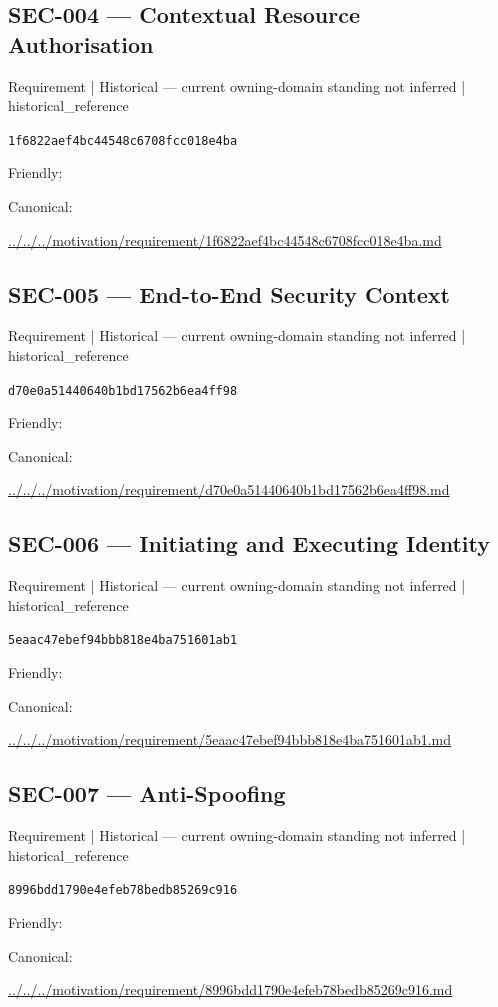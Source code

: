 \documentclass[10pt,a4paper]{article}
\begin{document}
\subsection*{SEC-004 — Contextual Resource Authorisation}
{\small Requirement | Historical — current owning-domain standing not inferred | historical\_reference}\par
\texttt{1f6822aef4bc44548c6708fcc018e4ba}\par
Friendly: \par
Canonical: \par
{\footnotesize\url{../../../motivation/requirement/1f6822aef4bc44548c6708fcc018e4ba.md}}\par
\subsection*{SEC-005 — End-to-End Security Context}
{\small Requirement | Historical — current owning-domain standing not inferred | historical\_reference}\par
\texttt{d70e0a51440640b1bd17562b6ea4ff98}\par
Friendly: \par
Canonical: \par
{\footnotesize\url{../../../motivation/requirement/d70e0a51440640b1bd17562b6ea4ff98.md}}\par
\subsection*{SEC-006 — Initiating and Executing Identity}
{\small Requirement | Historical — current owning-domain standing not inferred | historical\_reference}\par
\texttt{5eaac47ebef94bbb818e4ba751601ab1}\par
Friendly: \par
Canonical: \par
{\footnotesize\url{../../../motivation/requirement/5eaac47ebef94bbb818e4ba751601ab1.md}}\par
\subsection*{SEC-007 — Anti-Spoofing}
{\small Requirement | Historical — current owning-domain standing not inferred | historical\_reference}\par
\texttt{8996bdd1790e4efeb78bedb85269c916}\par
Friendly: \par
Canonical: \par
{\footnotesize\url{../../../motivation/requirement/8996bdd1790e4efeb78bedb85269c916.md}}\par
\end{document}
